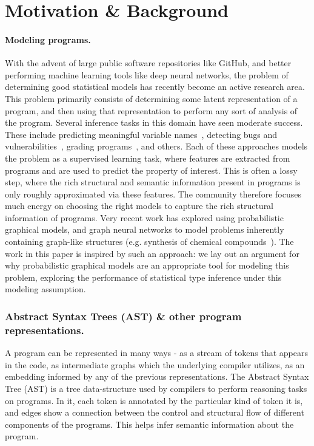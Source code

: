 \section{Motivation \& Background}
\label{sec:motivation}

\paragraph{Modeling programs.}
With the advent of large public software repositories like GitHub, and better performing machine learning tools like deep neural networks, the problem of determining good statistical models has recently become an active research area.
This problem primarily consists of determining some latent representation of a program, and then using that representation to perform any sort of analysis of the program.
Several inference tasks in this domain have seen moderate success.
These include predicting meaningful variable names~\cite{bigcode}, detecting bugs and vulnerabilities~\cite{bugs}, grading programs~\cite{ss}, and others.
Each of these approaches models the problem as a supervised learning task, where features are extracted from programs and are used to predict the property of interest.
This is often a lossy step, where the rich structural and semantic information present in programs is only roughly approximated via these features.
The community therefore focuses much energy on choosing the right models to capture the rich structural information of programs.
Very recent work has explored using probabilistic graphical models, and graph neural networks to model problems inherently containing graph-like structures (e.g. synthesis of chemical compounds~\cite{chemnips}).
The work in this paper is inspired by such an approach: we lay out an argument for why probabilistic graphical models are an appropriate tool for modeling this problem, exploring the performance of statistical type inference under this modeling assumption.

\subsubsection{Abstract Syntax Trees (AST) \& other program representations.} A program can be represented in many ways - as a stream of tokens that appears in the code, as intermediate graphs which the underlying compiler utilizes, as an embedding informed by any of the previous representations. The Abstract Syntax Tree (AST) is a tree data-structure used by compilers to perform reasoning tasks on programs.  In it, each token is annotated by the particular kind of token it is, and edges show a connection between the control and structural flow of different components of the programs. This helps infer semantic information about the program.

